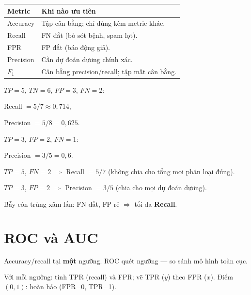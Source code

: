 \documentclass[12pt,a4paper]{article}
\begin{document}
\begin{congthuc}[title={Gợi ý chọn metric}]
\begin{tabularx}{\textwidth}{@{}l X@{}}
\textbf{Metric} & \textbf{Khi nào ưu tiên} \\
\midrule
Accuracy & Tập cân bằng; chỉ dùng kèm metric khác. \\
Recall & FN đắt (bỏ sót bệnh, spam lọt). \\
FPR & FP đắt (báo động giả). \\
Precision & Cần dự đoán dương chính xác. \\
$F_1$ & Cân bằng precision/recall; tập mất cân bằng. \\
\end{tabularx}
\end{congthuc}

\begin{vidu}[title={Tính recall và precision}]
$TP=5$, $TN=6$, $FP=3$, $FN=2$:

Recall $=5/7\approx 0{,}714$,

Precision $=5/8=0{,}625$.

$TP=3$, $FP=2$, $FN=1$:

Precision $=3/5=0{,}6$.
\end{vidu}

\begin{luuy}[title={Metric}]
$TP=5$, $FN=2$ $\Rightarrow$ Recall $=5/7$ (không chia cho tổng mọi phân loại đúng).

$TP=3$, $FP=2$ $\Rightarrow$ Precision $=3/5$ (chia cho mọi dự đoán dương).

Bẫy côn trùng xâm lấn: FN đắt, FP rẻ $\Rightarrow$ tối đa \textbf{Recall}.
\end{luuy}

\newpage

\section{ROC và AUC}

\begin{dongco}[title={Đánh giá mọi ngưỡng}]
Accuracy/recall tại \textbf{một} ngưỡng. ROC quét ngưỡng --- so sánh mô hình toàn cục.
\end{dongco}

\begin{dinhnghia}[title={Đường cong ROC}]
Với mỗi ngưỡng: tính TPR (recall) và FPR; vẽ TPR ($y$) theo FPR ($x$). Điểm $(0,1)$: hoàn hảo (FPR=0, TPR=1).
\end{dinhnghia}
\end{document}

